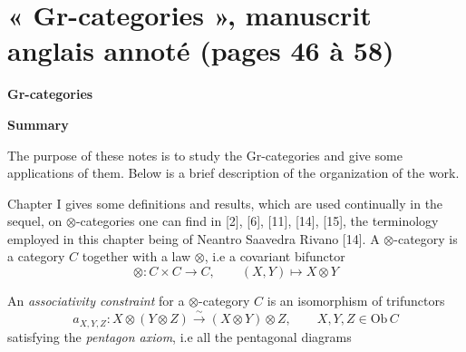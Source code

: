 \documentclass[11pt,a4paper]{article}
\begin{document}
\section*{« Gr-categories », manuscrit anglais annoté (pages 46 à 58)}


\textbf{Gr-categories}

\textbf{Summary}

The purpose of these notes is to study the Gr-categories and give some
applications of them. Below is a brief description of the organization of
the work.

Chapter I gives some definitions and results, which are used continually
in the sequel, on $\otimes$-categories one can find in [2], [6], [11],
[14], [15], the terminology employed in this chapter being of Neantro
Saavedra Rivano [14]. A $\otimes$-category is a category $C$ together with
a law $\otimes$, i.e a covariant bifunctor
\[
\otimes : C \times C \longrightarrow C, \qquad
(X, Y) \longmapsto X \otimes Y
\]

An \emph{associativity constraint} for a $\otimes$-category $C$ is an
isomorphism of trifunctors
\[
a_{X,Y,Z} : X \otimes (Y \otimes Z) \xrightarrow{\ \sim\ }
(X \otimes Y) \otimes Z, \qquad X, Y, Z \in \mathrm{Ob}\,C
\]
satisfying the \emph{pentagon axiom}, i.e all the pentagonal diagrams

\end{document}
